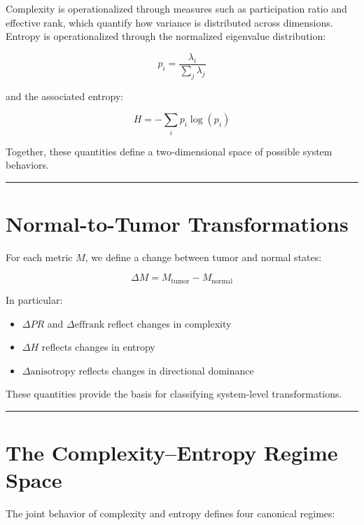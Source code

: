\documentclass[
  letterpaper,
  DIV=11,
  numbers=noendperiod,
  openany,
  oneside]{scrreprt}
\providecommand{\tightlist}{%
  \setlength{\itemsep}{0pt}\setlength{\parskip}{0pt}}
\begin{document}
Complexity is operationalized through measures such as participation
ratio and effective rank, which quantify how variance is distributed
across dimensions. Entropy is operationalized through the normalized
eigenvalue distribution:

\[
p_i = \frac{\lambda_i}{\sum_j \lambda_j}
\]

and the associated entropy:

\[
H = - \sum_i p_i \log(p_i)
\]

Together, these quantities define a two-dimensional space of possible
system behaviors.

\begin{center}\rule{0.5\linewidth}{0.5pt}\end{center}

\section{Normal-to-Tumor
Transformations}\label{normal-to-tumor-transformations}

For each metric \(M\), we define a change between tumor and normal
states:

\[
\Delta M = M_{\text{tumor}} - M_{\text{normal}}
\]

In particular:

\begin{itemize}
\tightlist
\item
  \(\Delta PR\) and \(\Delta \text{effrank}\) reflect changes in
  complexity\\
\item
  \(\Delta H\) reflects changes in entropy\\
\item
  \(\Delta \text{anisotropy}\) reflects changes in directional dominance
\end{itemize}

These quantities provide the basis for classifying system-level
transformations.

\begin{center}\rule{0.5\linewidth}{0.5pt}\end{center}

\section{The Complexity--Entropy Regime
Space}\label{the-complexityentropy-regime-space}

The joint behavior of complexity and entropy defines four canonical
regimes:
\end{document}
